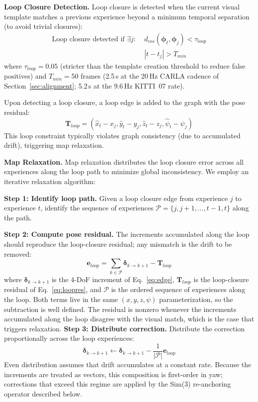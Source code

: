 \textbf{Loop Closure Detection.} Loop closure is detected when the current visual template matches a previous experience beyond a minimum temporal separation (to avoid trivial closures):
\begin{equation}
    \begin{aligned}
        \text{Loop closure detected if } \exists j:\; & d_{cos}(\boldsymbol{\phi}_t, \boldsymbol{\phi}_j) < \tau_{loop} \\
                                                      & |t - t_j| > T_{min}
    \end{aligned}
\end{equation}
where $\tau_{loop} = 0.05$ (stricter than the template creation threshold to reduce false positives) and $T_{min} = 50$ frames (2.5\,s at the 20\,Hz CARLA cadence of Section~\ref{sec:alignment}; 5.2\,s at the 9.6\,Hz KITTI~07 rate).

Upon detecting a loop closure, a loop edge is added to the graph with the pose residual:
\begin{equation}
    \mathbf{T}_{loop} = (\hat{x}_t - x_j, \hat{y}_t - y_j, \hat{z}_t - z_j, \hat{\psi}_t - \psi_j)
    \label{eq:loopres}
\end{equation}
This loop constraint typically violates graph consistency (due to accumulated drift), triggering map relaxation.

\textbf{Map Relaxation.} Map relaxation distributes the loop closure error across all experiences along the loop path to minimize global inconsistency. We employ an iterative relaxation algorithm:

\textbf{Step 1: Identify loop path.} Given a loop closure edge from experience $j$ to experience $t$, identify the sequence of experiences $\mathcal{P} = \{j, j+1, \ldots, t-1, t\}$ along the path.

\textbf{Step 2: Compute pose residual.} The increments accumulated along the loop should reproduce the loop-closure residual; any mismatch is the drift to be removed:
\begin{equation}
    \mathbf{e}_{loop} = \sum_{k \in \mathcal{P}} \boldsymbol{\delta}_{k \to k+1} - \mathbf{T}_{loop}
\end{equation}
where $\boldsymbol{\delta}_{k \to k+1}$ is the 4-DoF increment of Eq.~\eqref{eq:edge}, $\mathbf{T}_{loop}$ is the loop-closure residual of Eq.~\eqref{eq:loopres}, and $\mathcal{P}$ is the ordered sequence of experiences along the loop. Both terms live in the same $(x,y,z,\psi)$ parameterization, so the subtraction is well defined. The residual is nonzero whenever the increments accumulated along the loop disagree with the visual match, which is the case that triggers relaxation.
\textbf{Step 3: Distribute correction.} Distribute the correction proportionally across the loop experiences:
\begin{equation}
    \boldsymbol{\delta}_{k \to k+1} \leftarrow \boldsymbol{\delta}_{k \to k+1} - \frac{1}{|\mathcal{P}|}\mathbf{e}_{loop}
\end{equation}
Even distribution assumes that drift accumulates at a constant rate. Because the increments are treated as vectors, this composition is first-order in yaw; corrections that exceed this regime are applied by the Sim(3) re-anchoring operator described below.

